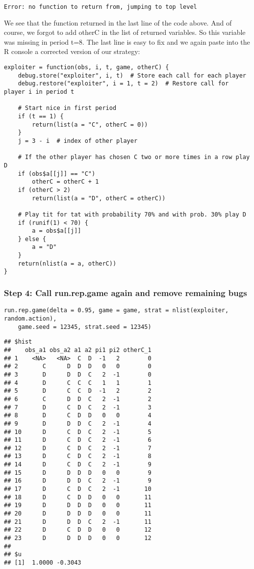 \documentclass[]{article}
\begin{document}
\begin{verbatim}
Error: no function to return from, jumping to top level
\end{verbatim}

We see that the function returned in the last line of the code above.
And of course, we forgot to add otherC in the list of returned
variables. So this variable was missing in period t=8. The last line is
easy to fix and we again paste into the R console a corrected version of
our strategy:

\begin{verbatim}
exploiter = function(obs, i, t, game, otherC) {
    debug.store("exploiter", i, t)  # Store each call for each player
    debug.restore("exploiter", i = 1, t = 2)  # Restore call for player i in period t

    # Start nice in first period
    if (t == 1) {
        return(list(a = "C", otherC = 0))
    }
    j = 3 - i  # index of other player

    # If the other player has chosen C two or more times in a row play D
    if (obs$a[[j]] == "C") 
        otherC = otherC + 1
    if (otherC > 2) 
        return(list(a = "D", otherC = otherC))

    # Play tit for tat with probability 70% and with prob. 30% play D
    if (runif(1) < 70) {
        a = obs$a[[j]]
    } else {
        a = "D"
    }
    return(nlist(a = a, otherC))
}
\end{verbatim}

\subsubsection{Step 4: Call run.rep.game again and remove remaining
bugs}

\begin{verbatim}
run.rep.game(delta = 0.95, game = game, strat = nlist(exploiter, random.action), 
    game.seed = 12345, strat.seed = 12345)
\end{verbatim}

\begin{verbatim}
## $hist
##    obs_a1 obs_a2 a1 a2 pi1 pi2 otherC_1
## 1    <NA>   <NA>  C  D  -1   2        0
## 2       C      D  D  D   0   0        0
## 3       D      D  D  C   2  -1        0
## 4       D      C  C  C   1   1        1
## 5       D      C  C  D  -1   2        2
## 6       C      D  D  C   2  -1        2
## 7       D      C  D  C   2  -1        3
## 8       D      C  D  D   0   0        4
## 9       D      D  D  C   2  -1        4
## 10      D      C  D  C   2  -1        5
## 11      D      C  D  C   2  -1        6
## 12      D      C  D  C   2  -1        7
## 13      D      C  D  C   2  -1        8
## 14      D      C  D  C   2  -1        9
## 15      D      D  D  D   0   0        9
## 16      D      D  D  C   2  -1        9
## 17      D      C  D  C   2  -1       10
## 18      D      C  D  D   0   0       11
## 19      D      D  D  D   0   0       11
## 20      D      D  D  D   0   0       11
## 21      D      D  D  C   2  -1       11
## 22      D      C  D  D   0   0       12
## 23      D      D  D  D   0   0       12
## 
## $u
## [1]  1.0000 -0.3043
\end{verbatim}
\end{document}
